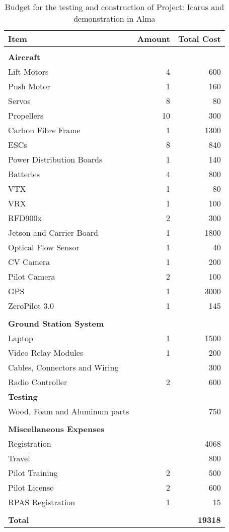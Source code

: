 \begin{table}[h]
\centering
\begin{tabular}{lrr}
\color{hyperrideblue} \textbf{Item} &
\color{hyperrideblue} \textbf{Amount} &
\color{hyperrideblue} \textbf{Total Cost} \\ \midrule
& & \\
\color{hyperrideblue} \textbf{Aircraft} &  &  \\ \midrule
Lift Motors & 4 & 600 \\
Push Motor & 1 & 160 \\
Servos & 8 & 80 \\
Propellers & 10 & 300 \\
Carbon Fibre Frame & 1 & 1300 \\
ESCs & 8 & 840 \\
Power Distribution Boards & 1 & 140 \\
Batteries & 4 & 800 \\
VTX & 1 & 80 \\
VRX & 1 & 100 \\
RFD900x & 2 & 300 \\
Jetson and Carrier Board & 1 & 1800 \\
Optical Flow Sensor & 1 & 40 \\
CV Camera & 1 & 200 \\
Pilot Camera & 2 & 100 \\
GPS & 1 & 3000 \\
ZeroPilot 3.0 & 1 & 145 \\
& & \\
\color{hyperrideblue} \textbf{Ground Station System} &  &  \\ \midrule
Laptop & 1 & 1500 \\
Video Relay Modules & 1 & 200 \\
Cables, Connectors and Wiring &  & 300 \\
Radio Controller & 2 & 600 \\
\color{hyperrideblue} \textbf{Testing} &  &  \\
Wood, Foam and Aluminum parts &  & 750 \\
& & \\
\color{hyperrideblue} \textbf{Miscellaneous Expenses} &  &  \\ \midrule
Registration & & 4068 \\
Travel &  & 800 \\
Pilot Training & 2 & 500 \\
Pilot License & 2 & 600 \\
RPAS Registration & 1 & 15 \\
& & \\ \midrule
\color{hyperrideblue} \textbf{Total} & \textbf{} & \textbf{19318}
\end{tabular}
\caption{Budget for the testing and construction of Project: Icarus and demonstration in
Alma}
\end{table}